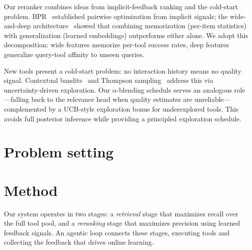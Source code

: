 \documentclass{article}
\begin{document}
Our reranker combines ideas from implicit-feedback ranking and the cold-start problem. BPR~\citep{rendle2009bpr} established pairwise optimization from implicit signals; the wide-and-deep architecture~\citep{cheng2016wide} showed that combining memorization (per-item statistics) with generalization (learned embeddings) outperforms either alone. We adopt this decomposition: wide features memorize per-tool success rates, deep features generalize query-tool affinity to unseen queries.

New tools present a cold-start problem: no interaction history means no quality signal. Contextual bandits~\citep{li2010contextual} and Thompson sampling~\citep{chapelle2011thompson} address this via uncertainty-driven exploration. Our $\alpha$-blending schedule serves an analogous role---falling back to the relevance head when quality estimates are unreliable---complemented by a UCB-style exploration bonus for underexplored tools. This avoids full posterior inference while providing a principled exploration schedule.


\section{Problem setting}
\label{sec:problem}

%


\section{Method}
\label{sec:method}

Our system operates in two stages: a \emph{retrieval} stage that maximizes recall over the full tool pool, and a \emph{reranking} stage that maximizes precision using learned feedback signals. An agentic loop connects these stages, executing tools and collecting the feedback that drives online learning.
\end{document}
